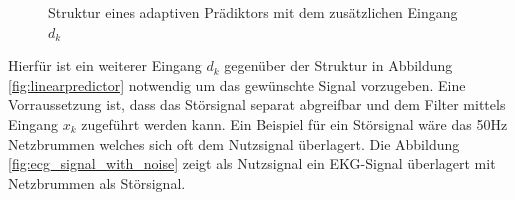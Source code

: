 \documentclass[
    10pt, %
    DIV12,
    english, %
    a5paper, %
    twoside, %
    titlepage, %
    parskip=half, %
    headings=small, %
    listof=totoc, %
    bibliography=totoc, %
    index=totoc, %
    captions=tableheading, %
    final %
]{scrbook}
\begin{document}
\begin{figure}[H]
\caption{Struktur eines adaptiven Prädiktors mit dem zusätzlichen Eingang $d_k$}
\label{fig:predictionfilter}
\end{figure}
\noindent
Hierfür ist ein weiterer Eingang $d_k$ gegenüber der Struktur in Abbildung \ref{fig:linearpredictor} notwendig um das gewünschte Signal vorzugeben. Eine Vorraussetzung ist, dass das Störsignal separat abgreifbar und dem Filter mittels Eingang 
$x_k$ zugeführt werden kann. Ein Beispiel für ein Störsignal wäre das 50Hz Netzbrummen welches sich oft dem Nutzsignal überlagert. Die Abbildung \ref{fig:ecg_signal_with_noise} 
zeigt als Nutzsignal ein EKG-Signal überlagert mit Netzbrummen als Störsignal.
\end{document}
